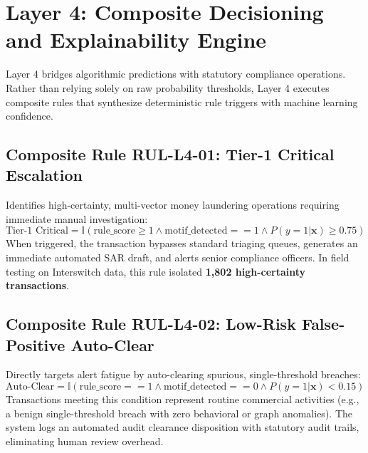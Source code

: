 \section{Layer 4: Composite Decisioning and Explainability Engine}
Layer 4 bridges algorithmic predictions with statutory compliance operations. Rather than relying solely on raw probability thresholds, Layer 4 executes composite rules that synthesize deterministic rule triggers with machine learning confidence.

\subsection{Composite Rule RUL-L4-01: Tier-1 Critical Escalation}
Identifies high-certainty, multi-vector money laundering operations requiring immediate manual investigation:
\begin{equation}
    \text{Tier-1 Critical} = \mathbb{I}\left( \text{rule\_score} \ge 1 \land \text{motif\_detected} == 1 \land P(y=1|\mathbf{x}) \ge 0.75 \right)
\end{equation}
When triggered, the transaction bypasses standard triaging queues, generates an immediate automated SAR draft, and alerts senior compliance officers. In field testing on Interswitch data, this rule isolated \textbf{1,802 high-certainty transactions}.

\subsection{Composite Rule RUL-L4-02: Low-Risk False-Positive Auto-Clear}
Directly targets alert fatigue by auto-clearing spurious, single-threshold breaches:
\begin{equation}
    \text{Auto-Clear} = \mathbb{I}\left( \text{rule\_score} == 1 \land \text{motif\_detected} == 0 \land P(y=1|\mathbf{x}) < 0.15 \right)
\end{equation}
Transactions meeting this condition represent routine commercial activities (e.g., a benign single-threshold breach with zero behavioral or graph anomalies). The system logs an automated audit clearance disposition with statutory audit trails, eliminating human review overhead.

